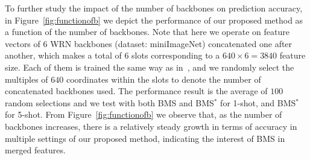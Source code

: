 \documentclass[review]{elsarticle}
\begin{document}
To further study the impact of the number of backbones on prediction accuracy, in Figure~\ref{fig:functionofb} we depict the performance of our proposed method as a function of the number of backbones. Note that here we operate on feature vectors of 6 WRN backbones (dataset: miniImageNet) concatenated one after another, which makes a total of 6 slots corresponding to a $640\times6=3840$ feature size. Each of them is trained the same way as in~\cite{mangla2020charting}, and we randomly select the multiples of $640$ coordinates within the slots to denote the number of concatenated backbones used. The performance result is the average of $100$ random selections and we test with both BMS and BMS$^*$ for 1-shot, and BMS$^*$ for 5-shot. From Figure~\ref{fig:functionofb} we observe that, as the number of backbones increases, there is a relatively steady growth in terms of accuracy in multiple settings of our proposed method, indicating the interest of BMS in merged features.  

\begin{table}[h]
    \caption{1-shot and 5-shot accuracy on miniImageNet, CUB and CIFAR-FS on our proposed PE$M_n$E-BMS with multi-backbones (backbone training procedure follows~\cite{mangla2020charting}, '+' denotes a concatenation of backbone features).}
    \centering
    \label{tab:results_sup2}
\end{table}
\end{document}
